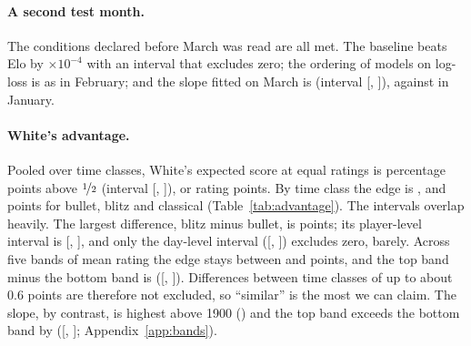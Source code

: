 \documentclass{article}
\newcommand{\tenm}{$\times 10^{-4}$}
\begin{document}
\paragraph{A second test month.} The conditions declared before March was read are all met. The baseline beats Elo by \dEloBaseMarAbs{}\tenm{} with an interval that excludes zero; the ordering of models on log-loss is \orderSame{} as in February; and the slope fitted on March is \SlopeAllMar{} (interval [\SlopeAllMarLo{}, \SlopeAllMarHi{}]), against \SlopeAllJan{} in January.

\begin{table}[t]
  \centering
  \caption{Baseline coefficients by time class, fitted on January; slope ratios are also fitted separately on February and March. White's edge is shown in expected-score points (pp) and in rating points. $\pm$ is half the width of the 95\% player-level interval. }
  \label{tab:advantage}
  \scriptsize
  \resizebox{\textwidth}{!}{}
\end{table}

\paragraph{White's advantage.} Pooled over time classes, White's expected score at equal ratings is \EdgePPAllJan{} percentage points above $\nicefrac{1}{2}$ (interval [\EdgePPAllJanLo{}, \EdgePPAllJanHi{}]), or \EdgePtsAllJan{} rating points. By time class the edge is \EdgePPBulletJan{}, \EdgePPBlitzJan{} and \EdgePPClassicalJan{} points for bullet, blitz and classical (Table~\ref{tab:advantage}). The intervals overlap heavily. The largest difference, blitz minus bullet, is \conBlitzBullet{} points; its player-level interval is [\conBlitzBulletLo{}, \conBlitzBulletHi{}], and only the day-level interval ([\conBlitzBulletDayLo{}, \conBlitzBulletDayHi{}]) excludes zero, barely. Across five bands of mean rating the edge stays between \bandEdgeMin{} and \bandEdgeMax{} points, and the top band minus the bottom band is \bandEdgeContrast{} ([\bandEdgeLo{}, \bandEdgeHi{}]). Differences between time classes of up to about 0.6 points are therefore not excluded, so ``similar'' is the most we can claim. The slope, by contrast, is highest above 1900 (\SlopeBandE{}) and the top band exceeds the bottom band by \bandContrast{} ([\bandContrastLo{}, \bandContrastHi{}]; Appendix~\ref{app:bands}).

\begin{table}[t]
  \centering
  \caption{Rating-noise checks on January: the slope ratio $\beta_1/(\ln 10/400)$ of the pooled baseline on subsets of games, with 95\% player-level intervals. ``Settled'' is measured by the mean absolute rating change over a player's games on earlier days; thirds are of the larger of the two players' values.}
  \label{tab:noise}
  \small
  
\end{table}
\end{document}
